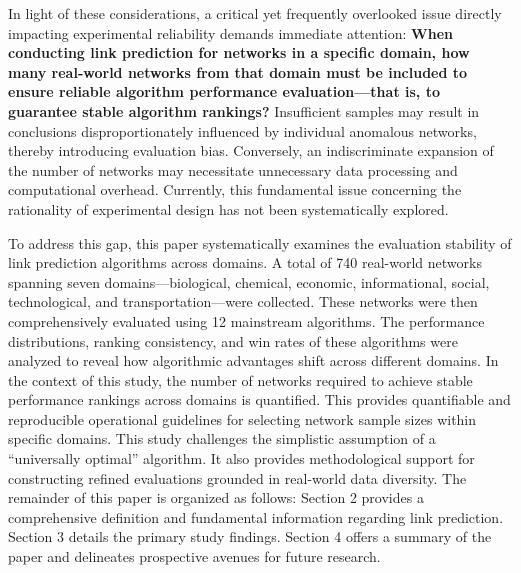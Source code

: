 \documentclass{article}
\begin{document}
 In light of these considerations, a critical yet frequently overlooked issue directly impacting experimental reliability demands immediate attention: \textbf{When conducting link prediction for networks in a specific domain, how many real-world networks from that domain must be included to ensure reliable algorithm performance evaluation—that is, to guarantee stable algorithm rankings?} Insufficient samples may result in conclusions disproportionately influenced by individual anomalous networks, thereby introducing evaluation bias. Conversely, an indiscriminate expansion of the number of networks may necessitate unnecessary data processing and computational overhead. Currently, this fundamental issue concerning the rationality of experimental design \cite{lakens2022} has not been systematically explored.

To address this gap, this paper systematically examines the evaluation stability of link prediction algorithms across domains. A total of 740 real-world networks spanning seven domains—biological, chemical, economic, informational, social, technological, and transportation—were collected. These networks were then comprehensively evaluated using 12 mainstream algorithms. The performance distributions, ranking consistency, and win rates of these algorithms were analyzed to reveal how algorithmic advantages shift across different domains. In the context of this study, the number of networks required to achieve stable performance rankings across domains is quantified. This provides quantifiable and reproducible operational guidelines for selecting network sample sizes within specific domains. This study challenges the simplistic assumption of a ``universally optimal'' algorithm. It also provides methodological support for constructing refined evaluations grounded in real-world data diversity. The remainder of this paper is organized as follows: Section 2 provides a comprehensive definition and fundamental information regarding link prediction. Section 3 details the primary study findings. Section 4 offers a summary of the paper and delineates prospective avenues for future research.
\end{document}
